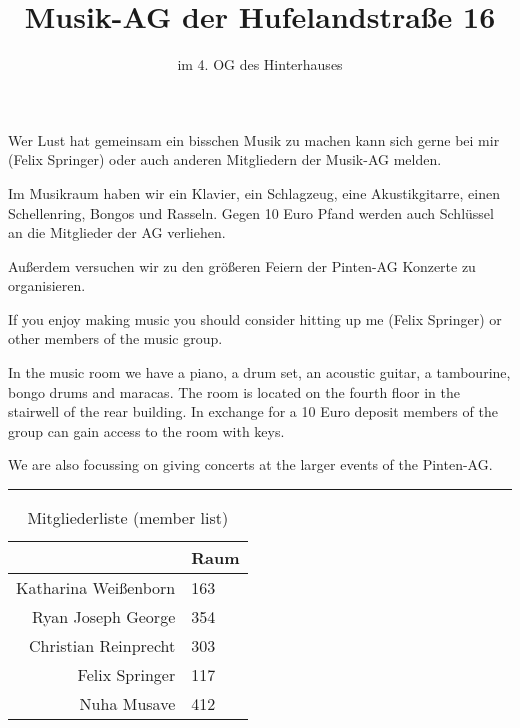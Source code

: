 \documentclass[a4paper,12pt]{scrartcl}
\title{Musik-AG der Hufelandstraße 16}
\subtitle{im 4. OG des Hinterhauses}
\author{}
\date{}
\begin{document}
\maketitle

Wer Lust hat gemeinsam ein bisschen Musik zu machen kann sich gerne bei mir (Felix Springer) oder
auch anderen Mitgliedern der Musik-AG melden.

Im Musikraum haben wir ein Klavier, ein Schlagzeug, eine Akustikgitarre, einen Schellenring, Bongos
und Rasseln.
Gegen 10 Euro Pfand werden auch Schlüssel an die Mitglieder der AG verliehen.

Außerdem versuchen wir zu den größeren Feiern der Pinten-AG Konzerte zu organisieren.

{
    \color{orange}
    If you enjoy making music you should consider hitting up me (Felix Springer) or other members
    of the music group.

    In the music room we have a piano, a drum set, an acoustic guitar, a tambourine, bongo drums
    and maracas.
    The room is located on the fourth floor in the stairwell of the rear building.
    In exchange for a 10 Euro deposit members of the group can gain access to the room
    with keys.

    We are also focussing on giving concerts at the larger events of the Pinten-AG.
}

\noindent\rule{\textwidth}{1pt}

\vspace{20mm}

\begin{table}[h]
    \centering
    \caption{\large{Mitgliederliste {\color{orange} (member list)}}}
    \begin{tabular}{r|l}
        & Raum \color{orange}{(room)} \\
        \midrule
        Katharina Weißenborn & 163 \\
        Ryan Joseph George & 354 \\
        Christian Reinprecht & 303 \\
        Felix Springer & 117 \\
        Nuha Musave & 412 \\
    \end{tabular}
\end{table}
\end{document}
